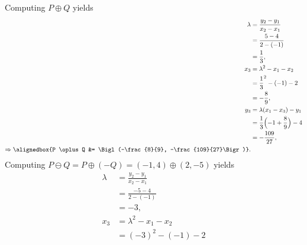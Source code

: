 \documentclass[
  coursecode={MTHE 418},
  assignmentname={Homework \homeworknumber},
  studentnumber=20053722,
  name={Bryan Hoang},
  draft,
]{
  ltxanswer%
}
\begin{document}
  \begin{questions}
    \setcounter{question}{\questionnumber}
    \addtocounter{question}{-1}
    \question[10]\
    \begin{parts}
      \part{}
      \begin{solution}
        Computing \(P \oplus Q\) yields
        \begin{align*}
          \lambda                            &= \frac{y_{2} - y_{1}}{x_{2} - x_{1}}          \\
                                             &= \frac{5 - 4}{2 - (-1)}                       \\
                                             &= \frac{1}{3},                                 \\
          x_{3}                              &= \lambda^{2} - x_{1} - x_{2}                  \\
                                             &= \frac{1}{3}^{2} - (-1) - 2                   \\
                                             &= -\frac{8}{9},                                \\
          y_{3}                              &= \lambda(x_{1} - x_{3}) - y_{1}               \\
                                             &= \frac{1}{3} \Bigl(-1 + \frac{8}{9}\Bigr) - 4 \\
                                             &= -\frac{109}{27},                             \\
          \Rightarrow \alignedbox{P \oplus Q &= \Bigl(-\frac{8}{9}, -\frac{109}{27}\Bigr)}.
        \end{align*}
        Computing \(P \ominus Q = P \oplus (-Q) = (-1, 4) \oplus (2, -5) \) yields
        \begin{align*}
          \lambda                             &= \frac{y_{2} - y_{1}}{x_{2} - x_{1}} \\
                                              &= \frac{-5 - 4}{2 - (-1)}             \\
                                              &= -3,                                 \\
          x_{3}                               &= \lambda^{2} - x_{1} - x_{2}         \\
                                              &= (-3)^{2} - (-1) - 2                 \\

\end{align*}
\end{solution}
\end{parts}
\end{questions}
\end{document}
